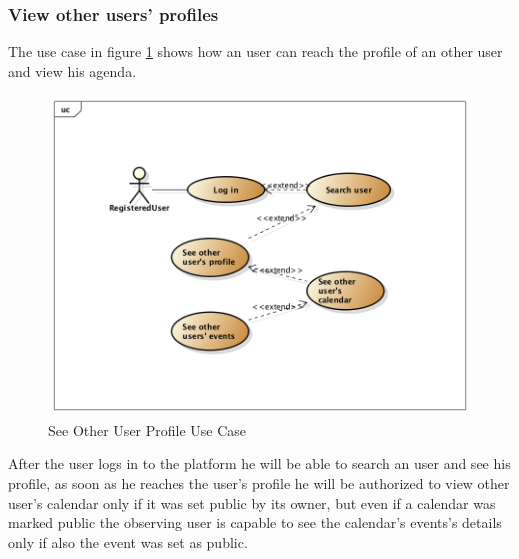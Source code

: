 \subsubsection{View other users' profiles}
The use case in figure \ref{fig:otherprofileusecase} shows how an user can reach the profile of an other user and view his agenda.  \begin{center}
 \begin{figure}[H]
    \includegraphics[width=1\textwidth]{../UMLDiagram/use_case/ViewOtherProfiles/UseCaseDiagram0.png}
    \caption{See Other User Profile Use Case}
     \label{fig:otherprofileusecase}
     \end{figure}
   \end{center}  
After the user logs in to the platform he will be able to search an user and see his profile, as soon as he reaches the user's profile he will be authorized to view other user's calendar only if it was set public by its owner, but even if a calendar was marked public the observing user is capable to see the calendar's events's details only if also the event was set as public.

